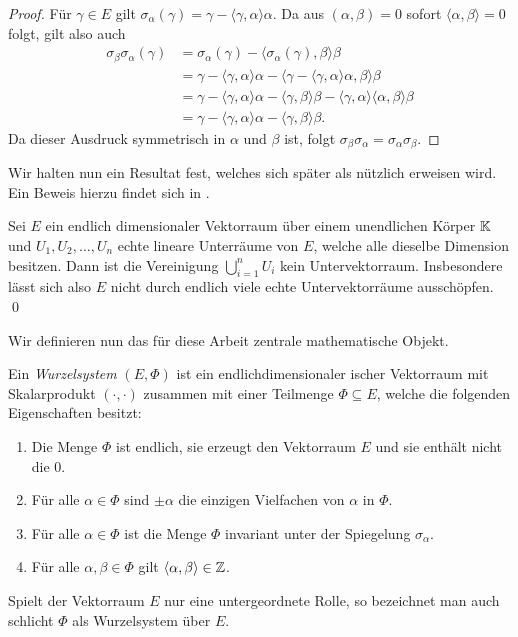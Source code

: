 \begin{proof}
  Für $\gamma \in E$ gilt $\sigma_\alpha(\gamma) = \gamma - \langle \gamma, \alpha \rangle \alpha$. Da aus $(\alpha, \beta) = 0$ sofort $\langle \alpha, \beta \rangle = 0$ folgt, gilt also auch
  \begin{align*}
    \sigma_\beta \sigma_\alpha(\gamma) 
    &= \sigma_\alpha(\gamma) - \langle \sigma_\alpha(\gamma), \beta \rangle \beta \\
    &= \gamma - \langle \gamma, \alpha \rangle \alpha 
              - \langle \gamma- \langle \gamma, \alpha\rangle \alpha, \beta \rangle \beta \\
    &= \gamma - \langle \gamma, \alpha \rangle \alpha 
              - \langle \gamma, \beta \rangle \beta - \langle \gamma, \alpha \rangle \langle \alpha, \beta \rangle \beta \\
    &= \gamma - \langle \gamma, \alpha \rangle \alpha - \langle \gamma, \beta \rangle \beta.
  \end{align*} 
  Da dieser Ausdruck symmetrisch in $\alpha$ und $\beta$ ist, folgt $\sigma_\beta \sigma_\alpha = \sigma_\alpha \sigma_\beta$.
\end{proof}

Wir halten nun ein Resultat fest, welches sich später als nützlich erweisen wird. Ein Beweis hierzu findet sich in \cite[S.123 und S.242]{erdmann2006introduction}.

\begin{prop}
  \label{prop:unterraumAusschoepfung} 
  Sei $E$ ein endlich dimensionaler Vektorraum über einem unendlichen Körper $\mathbb{K}$ und $U_1, U_2, \dots, U_n$ echte lineare Unterräume von $E$, welche alle dieselbe Dimension besitzen.
  Dann ist die Vereinigung $\bigcup_{i=1}^n U_i$ kein Untervektorraum.
  Insbesondere lässt sich also $E$ nicht durch endlich viele echte Untervektorräume ausschöpfen.
  \qed
\end{prop}

Wir definieren nun das für diese Arbeit zentrale mathematische Objekt.

\begin{defn}
  Ein \emph{Wurzelsystem} $(E,\Phi)$ ist ein endlichdimensionaler \euklid ischer Vektorraum mit Skalarprodukt $(\cdot,\cdot)$ zusammen mit einer Teilmenge $\Phi \subseteq E$, welche die folgenden Eigenschaften besitzt:
  \begin{enumerate}[(R1)]
    \item\label{it:R1} Die Menge $\Phi$ ist endlich, sie erzeugt den Vektorraum $E$ und sie enthält nicht die $0$.
    \item\label{it:R2} Für alle $\alpha \in \Phi$ sind $\pm \alpha$ die einzigen Vielfachen von $\alpha$ in $\Phi$.
    \item\label{it:R3} Für alle $\alpha \in \Phi$ ist die Menge $\Phi$ invariant unter der Spiegelung $\sigma_\alpha$.
    \item\label{it:R4} Für alle $\alpha, \beta \in \Phi$ gilt $\langle \alpha, \beta \rangle \in \mathbb{Z}$.
  \end{enumerate}
  Spielt der Vektorraum $E$ nur eine untergeordnete Rolle, so bezeichnet man auch schlicht $\Phi$ als Wurzelsystem über $E$.
\end{defn}

